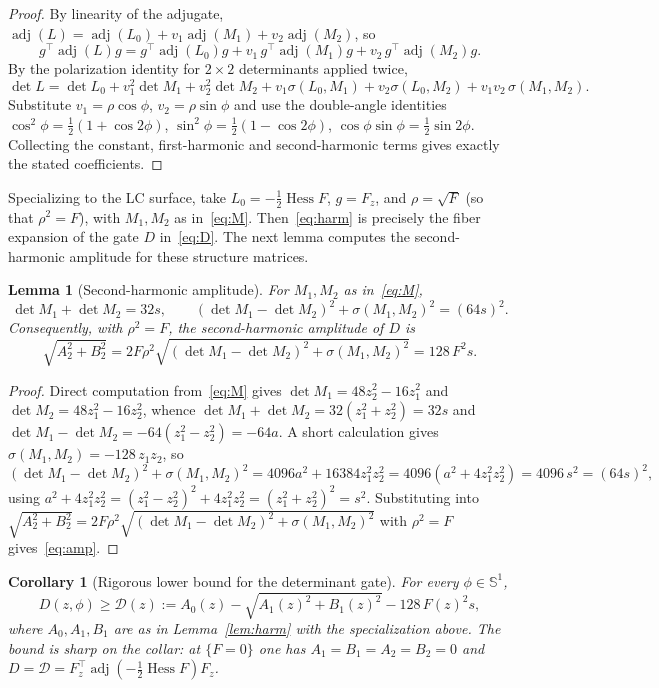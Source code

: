 \documentclass[11pt,reqno]{amsart}
\theoremstyle{plain}
\newtheorem{lemma}[theorem]{Lemma}
\newtheorem{corollary}[theorem]{Corollary}
\theoremstyle{definition}
\DeclareMathOperator{\adj}{adj}
\DeclareMathOperator{\Hess}{Hess}
\newcommand{\Sph}{\mathbb{S}}
\newcommand{\calD}{\mathcal{D}}
\newcommand{\Fz}{F_{z}}
\begin{document}
\begin{proof}
By linearity of the adjugate, $\adj(L)=\adj(L_0)+v_1\adj(M_1)+v_2\adj(M_2)$, so
\[
g^\top\adj(L)g=g^\top\adj(L_0)g+v_1\,g^\top\adj(M_1)g+v_2\,g^\top\adj(M_2)g.
\]
By the polarization identity for $2\times2$ determinants applied twice,
\[
\det L=\det L_0+v_1^2\det M_1+v_2^2\det M_2+v_1\sigma(L_0,M_1)+v_2\sigma(L_0,M_2)+v_1v_2\,\sigma(M_1,M_2).
\]
Substitute $v_1=\rho\cos\phi$, $v_2=\rho\sin\phi$ and use the double-angle identities
$\cos^2\phi=\tfrac12(1+\cos2\phi)$, $\sin^2\phi=\tfrac12(1-\cos2\phi)$, $\cos\phi\sin\phi=\tfrac12\sin2\phi$.
Collecting the constant, first-harmonic and second-harmonic terms gives exactly the stated coefficients.
\end{proof}

Specializing to the LC surface, take $L_0=-\tfrac12\Hess F$, $g=\Fz$, and $\rho=\sqrt{F}$ (so that $\rho^2=F$), with $M_1,M_2$ as in~\eqref{eq:M}. Then~\eqref{eq:harm} is precisely the fiber expansion of the gate $D$ in~\eqref{eq:D}. The next lemma computes the second-harmonic amplitude for these structure matrices.

\begin{lemma}[Second-harmonic amplitude]\label{lem:amp}
For $M_1,M_2$ as in~\eqref{eq:M},
\begin{equation}\label{eq:detsum}
\det M_1+\det M_2=32s,
\qquad
(\det M_1-\det M_2)^2+\sigma(M_1,M_2)^2=(64s)^2.
\end{equation}
Consequently, with $\rho^2=F$, the second-harmonic amplitude of $D$ is
\begin{equation}\label{eq:amp}
\sqrt{A_2^2+B_2^2}=2F\rho^2\sqrt{(\det M_1-\det M_2)^2+\sigma(M_1,M_2)^2}=128\,F^2 s.
\end{equation}
\end{lemma}

\begin{proof}
Direct computation from~\eqref{eq:M} gives $\det M_1=48z_2^2-16z_1^2$ and $\det M_2=48z_1^2-16z_2^2$, whence $\det M_1+\det M_2=32(z_1^2+z_2^2)=32s$ and $\det M_1-\det M_2=-64(z_1^2-z_2^2)=-64a$. A short calculation gives $\sigma(M_1,M_2)=-128\,z_1z_2$, so
\[
(\det M_1-\det M_2)^2+\sigma(M_1,M_2)^2=4096a^2+16384z_1^2z_2^2=4096(a^2+4z_1^2z_2^2)=4096\,s^2=(64s)^2,
\]
using $a^2+4z_1^2z_2^2=(z_1^2-z_2^2)^2+4z_1^2z_2^2=(z_1^2+z_2^2)^2=s^2$. Substituting into $\sqrt{A_2^2+B_2^2}=2F\rho^2\sqrt{(\det M_1-\det M_2)^2+\sigma(M_1,M_2)^2}$ with $\rho^2=F$ gives~\eqref{eq:amp}.
\end{proof}

\begin{corollary}[Rigorous lower bound for the determinant gate]\label{cor:Dbound}
For every $\phi\in\Sph^1$,
\begin{equation}\label{eq:Dbound}
D(z,\phi)\ge \calD(z):=A_0(z)-\sqrt{A_1(z)^2+B_1(z)^2}-128\,F(z)^2 s,
\end{equation}
where $A_0,A_1,B_1$ are as in Lemma~\ref{lem:harm} with the specialization above. The bound is sharp on the collar: at $\{F=0\}$ one has $A_1=B_1=A_2=B_2=0$ and $D=\calD=\Fz^{\!\top}\adj(-\tfrac12\Hess F)\Fz$.
\end{corollary}
\end{document}
